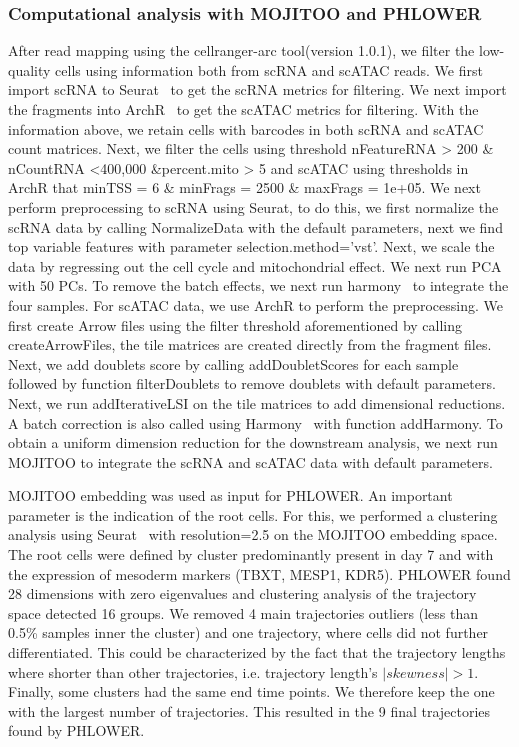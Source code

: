\subsubsection{Computational analysis with MOJITOO and PHLOWER}
After read mapping using the cellranger-arc tool(version 1.0.1), we filter the low-quality cells using information both from scRNA and scATAC reads. We first import scRNA to Seurat~\citep{stuart2019seurat3} to get the scRNA metrics for filtering. We next import the fragments into ArchR~\citep{granja2021archr} to get the scATAC metrics for filtering. With the information above, we retain cells with barcodes in both scRNA and scATAC count matrices. Next, we filter the cells using threshold nFeatureRNA > 200 \& nCountRNA <400,000 \&percent.mito > 5 and scATAC using thresholds in ArchR that minTSS = 6 \& minFrags = 2500 \& maxFrags = 1e+05. We next perform preprocessing to scRNA using Seurat, to do this, we first normalize the scRNA data by calling NormalizeData with the default parameters, next we find top variable features with parameter selection.method='vst'. Next, we scale the data by regressing out the cell cycle and mitochondrial effect. We next run PCA with 50 PCs. To remove the batch effects, we next run harmony~\citep{korsunsky2019harmony} to integrate the four samples. For scATAC data, we use ArchR to perform the preprocessing. We first create Arrow files using the filter threshold aforementioned by calling createArrowFiles, the tile matrices are created directly from the fragment files. Next, we add doublets score by calling addDoubletScores for each sample followed by function filterDoublets to remove doublets with default parameters. Next, we run addIterativeLSI on the tile matrices to add dimensional reductions. A batch correction is also called using Harmony~\citep{korsunsky2019harmony} with function addHarmony. To obtain a uniform dimension reduction for the downstream analysis, we next run MOJITOO to integrate the scRNA and scATAC data with default parameters. 

MOJITOO embedding was used as input for PHLOWER. An important parameter is the indication of the root cells. For this, we performed a clustering analysis using Seurat~\citep{stuart2019seurat3} with resolution=2.5 on the MOJITOO embedding space. The root cells were defined by cluster predominantly present in day 7 and with the expression of mesoderm markers (TBXT, MESP1, KDR5). PHLOWER found 28 dimensions with zero eigenvalues and clustering analysis of the trajectory space detected 16 groups. We removed 4 main trajectories outliers (less than 0.5\% samples inner the cluster) and one trajectory, where cells did not further differentiated. This could be characterized by the fact that the trajectory lengths where shorter than other trajectories, i.e. trajectory length's $|skewness| > 1$. 
Finally, some clusters had the same end time points. We therefore keep the one with the largest number of trajectories. This resulted in the 9 final trajectories found by PHLOWER.

